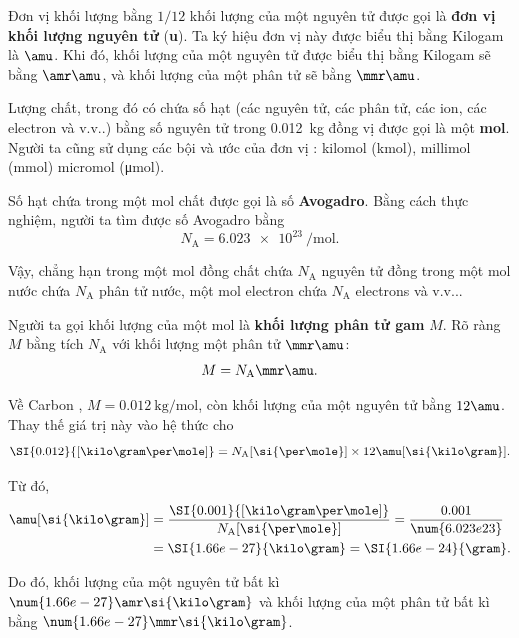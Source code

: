 Đơn vị khối lượng bằng $1/12$ khối lượng của một nguyên tử  được gọi là \textbf{đơn vị khối lượng nguyên tử} (\textbf{\si{\atomicmassunit}}). Ta ký hiệu đơn vị này được biểu thị bằng Kilogam là $\amu$. Khi đó, khối lượng của một nguyên tử được biểu thị bằng Kilogam sẽ bằng $\amr\amu$, và khối lượng của một phân tử sẽ bằng $\mmr\amu$.

Lượng chất, trong đó có chứa số hạt (các nguyên tử, các phân tử, các ion, các electron và v.v..) bằng số nguyên tử trong \SI{0.012}{\kilo\gram} đồng vị  được gọi là một \textbf{mol}. Người ta cũng sử dụng các bội và ước của đơn vị : kilomol (\si{\kilo\mol}), millimol (\si{\milli\mol}) micromol (\si{\micro\mol}).

Số hạt chứa trong một mol chất được gọi là số \textbf{Avogadro}. Bằng cách thực nghiệm, người ta tìm được số Avogadro bằng
\begin{equation}\label{eq:10_1}
	N_{\text{A}} = \SI{6.023e23}{\per\mole}.
\end{equation}

\noindent
Vậy, chẳng hạn trong một mol đồng chất chứa $N_{\text{A}}$ nguyên tử đồng trong một mol nước chứa $N_{\text{A}}$ phân tử nước, một mol electron chứa $N_{\text{A}}$ electrons và v.v...

Người ta gọi khối lượng của một mol là \textbf{khối lượng phân tử gam}  $M$. Rõ ràng $M$ bằng tích $N_{\text{A}}$ với khối lượng một phân tử $\mmr\amu$:
\begin{equation}\label{eq:10_2}
	M = N_{\text{A}}\mmr\amu.
\end{equation}

Về Carbon , $M=\SI{0.012}{\kilo\gram\per\mole}$, còn khối lượng của một nguyên tử bằng  $12\amu$. Thay thế giá trị này vào hệ thức  cho
\begin{equation*}
	\SI{0.012}{[\kilo\gram\per\mole]} = N_{\text{A}} [\si{\per\mole}] \times 12\amu [\si{\kilo\gram}].
\end{equation*}

\noindent
Từ đó,
\begin{align}
	\amu [\si{\kilo\gram}] &= \frac{\SI{0.001}{[\kilo\gram\per\mole]}}{N_{\text{A}} [\si{\per\mole}]} = \frac{0.001}{\num{6.023e23}}\nonumber\\
	&= \SI{1.66e-27}{\kilo\gram} = \SI{1.66e-24}{\gram}.\label{eq:10_3}
\end{align}

\noindent
Do đó, khối lượng của một nguyên tử bất kì $\num{1.66e-27}\amr\si{\kilo\gram}$ và khối lượng của một phân tử bất kì bằng $\num{1.66e-27}\mmr\si{\kilo\gram}$.

